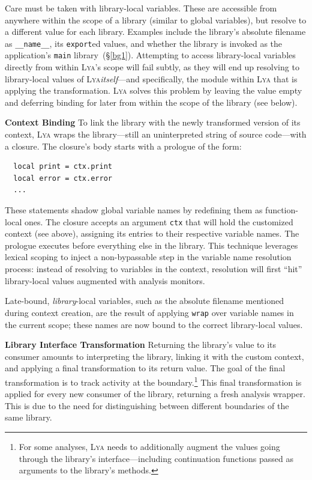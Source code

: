 \documentclass[letterpaper,twocolumn,10pt]{article}
\newcommand{\heading}[1]{\vspace{2pt}\noindent\textbf{#1}\enspace}
\newcommand{\ttt}[1]{\texttt{#1}}
\newcommand{\sx}[1]{(\S\ref{#1})}
\newcommand{\sys}{{\scshape Lya}\xspace}
\begin{document}
Care must be taken with library-local variables. %
These are accessible from anywhere within the scope of a library (similar to global variables), but resolve to a different value for each library.
Examples include the library's absolute filename as \ttt{\_\_name\_\_}, its \ttt{export}ed values, and whether the library is invoked as the application's \ttt{main} library~\sx{bg1}.
Attempting to access library-local variables directly from within \sys's scope will fail subtly, as they will end up resolving to library-local values of \sys \emph{itself}---and specifically, the module within \sys that is applying the transformation.
\sys solves this problem by leaving the value empty and deferring binding for later from within the scope of the library (see below).

\heading{Context Binding}
To link the library with the newly transformed version of its context, \sys wraps the library---still an uninterpreted string of source code---with a closure.
The closure's body starts with a prologue of the form:
\begin{verbatim}
  local print = ctx.print
  local error = ctx.error
  ...
\end{verbatim}
These statements shadow global variable names by redefining them as function-local ones.
The closure accepts an argument \ttt{ctx} that will hold the customized context (see above), assigning its entries to their respective variable names.
The prologue executes before everything else in the library.
This technique leverages lexical scoping to inject a non-bypassable step in the variable name resolution process:
  instead of resolving to variables in the context, resolution will first ``hit'' library-local values augmented with analysis monitors.

Late-bound, \emph{library}-local variables, such as the absolute filename mentioned during context creation, are the result of applying \ttt{wrap} over variable names in the current scope;
  these names are now bound to the correct library-local values.

\heading{Library Interface Transformation}
Returning the library's value to its consumer amounts to interpreting the library, linking it with the custom context, and applying a final transformation to its return value.
The goal of the final transformation is to track activity at the boundary.\footnote{
  For some analyses, \sys needs to additionally augment the values going through the library's interface---including continuation functions passed as arguments to the library's methods.}
This final transformation is applied for every new consumer of the library, returning a fresh analysis wrapper.
This is due to the need for distinguishing between different boundaries of the same library.
\end{document}
